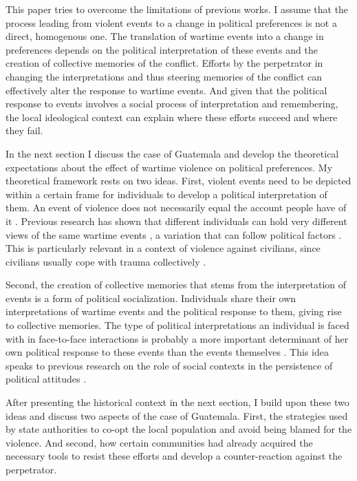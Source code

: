 \documentclass[12pt, notitlepage]{article}
\begin{document}
This paper tries to overcome the limitations of previous works.
I assume that the process leading from violent events to a change in political preferences is not a direct, homogenous one.
The translation of wartime events into a change in preferences depends on the political interpretation of these events and the creation of collective memories of the conflict.
Efforts by the perpetrator in changing the interpretations and thus steering memories of the conflict can effectively alter the response to wartime events.
And given that the political response to events involves a social process of interpretation and remembering, the local ideological context can explain where these efforts succeed and where they fail.

In the next section I discuss the case of Guatemala and develop the theoretical expectations about the effect of wartime violence on political preferences.
My theoretical framework rests on two ideas.
First, violent events need to be depicted within a certain frame for individuals to develop a political interpretation of them.
An event of violence does not necessarily equal the account people have of it \citep{Basta:2018aa}.
Previous research has shown that different individuals can hold very different views of the same wartime events \citep{Driscoll:2016aa}, a variation that can follow political factors \citep{Silverman:2019aa}.
This is particularly relevant in a context of violence against civilians, since civilians usually cope with trauma collectively \citep{Lyons:1998aa}.

Second, the creation of collective memories that stems from the interpretation of events is a form of political socialization.
Individuals share their own interpretations of wartime events and the political response to them, giving rise to collective memories.
The type of political interpretations an individual is faced with in face-to-face interactions is probably a more important determinant of her own political response to these events than the events themselves \citep{Dyrstad:2012aa, Molina:2014aa, Glaurdic:2016aa}.
This idea speaks to previous research on the role of social contexts in the persistence of political attitudes \citep{Wittenberg:2006aa, Tavits:2013aa}.

After presenting the historical context in the next section, I build upon these two ideas and discuss two aspects of the case of Guatemala.
First, the strategies used by state authorities to co-opt the local population and avoid being blamed for the violence.
And second, how certain communities had already acquired the necessary tools to resist these efforts and develop a counter-reaction against the perpetrator.
\end{document}
